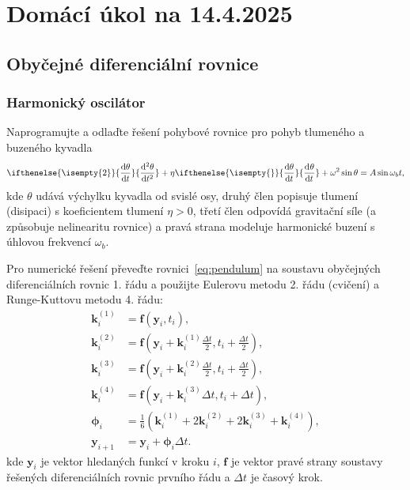 \documentclass[a4paper,11pt,twoside]{article}
\def\vector#1{\boldsymbol{#1}}								%
\renewcommand{\d}{\mathrm{d}}
\newcommand{\derivative}[3][]{\ifthenelse{\isempty{#1}}	    %
	{\frac{\d{#2}}{\d{#3}}}
	{\frac{\d^{#1}{#2}}{\d{#3}^{#1}}}
}
\begin{document}
\section*{Domácí úkol na 14.4.2025}
\subsection*{Obyčejné diferenciální rovnice}
\subsubsection*{Harmonický oscilátor}
Naprogramujte a odlaďte řešení pohybové rovnice pro pohyb tlumeného a buzeného kyvadla
\begin{equation}
    \label{eq:pendulum}
    \derivative[2]{\theta}{t}+\eta\derivative{\theta}{t}+\omega^{2}\sin{\theta}=A\sin\omega_{b}t,
\end{equation}
kde $\theta$ udává výchylku kyvadla od svislé osy, druhý člen popisuje tlumení (disipaci) s koeficientem tlumení $\eta>0$, třetí člen odpovídá gravitační síle (a způsobuje nelinearitu rovnice) a pravá strana modeluje harmonické buzení s úhlovou frekvencí $\omega_b$.

Pro numerické řešení převeďte rovnici~\eqref{eq:pendulum} na soustavu obyčejných diferenciálních rovnic 1. řádu a použijte Eulerovu metodu 2. řádu (cvičení) a Runge-Kuttovu metodu 4. řádu:
\begin{align*}
    \vector{k}^{(1)}_{i}&=\vector{f}(\vector{y}_{i},t_{i}),\\
    \vector{k}^{(2)}_{i}&=\vector{f}\left(\vector{y}_{i}+\vector{k}^{(1)}_{i}\frac{\Delta t}{2},t_{i}+\frac{\Delta t}{2}\right),\\
    \vector{k}^{(3)}_{i}&=\vector{f}\left(\vector{y}_{i}+\vector{k}^{(2)}_{i}\frac{\Delta t}{2},t_{i}+\frac{\Delta t}{2}\right),\\
    \vector{k}^{(4)}_{i}&=\vector{f}\left(\vector{y}_{i}+\vector{k}^{(3)}_{i}\Delta t,t_{i}+\Delta t\right),\\
    \vector{\phi}_{i}&=\frac{1}{6}\left(\vector{k}^{(1)}_{i}+2\vector{k}^{(2)}_{i}+2\vector{k}^{(3)}_{i}+\vector{k}^{(4)}_{i}\right),\\
    \vector{y}_{i+1}&=\vector{y}_{i}+\vector{\phi}_{i}\Delta t.
\end{align*}
kde $\vector{y}_{i}$ je vektor hledaných funkcí v kroku $i$, $\vector{f}$ je vektor pravé strany soustavy řešených diferenciálních rovnic prvního řádu a $\Delta t$ je časový krok.
\end{document}
